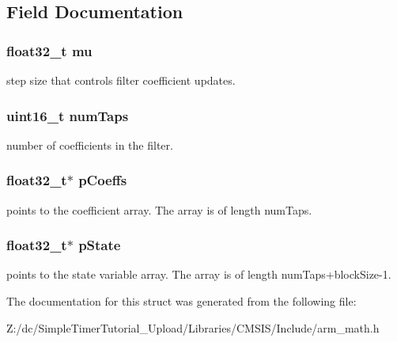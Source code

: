 \subsection{Field Documentation}
\hypertarget{structarm__lms__instance__f32_a11402afa7c9b9dac4cb953fa386e74d2}{
\subsubsection[{mu}]{\setlength{\rightskip}{0pt plus 5cm}float32\-\_\-t mu}}\label{structarm__lms__instance__f32_a11402afa7c9b9dac4cb953fa386e74d2}
step size that controls filter coefficient updates. \hypertarget{structarm__lms__instance__f32_a751941891e47f522a7f5375fe8990aac}{
\subsubsection[{num\-Taps}]{\setlength{\rightskip}{0pt plus 5cm}uint16\-\_\-t num\-Taps}}\label{structarm__lms__instance__f32_a751941891e47f522a7f5375fe8990aac}
number of coefficients in the filter. \hypertarget{structarm__lms__instance__f32_aacbb8dd8eeba4b21fc2bb40076405ee3}{
\subsubsection[{p\-Coeffs}]{\setlength{\rightskip}{0pt plus 5cm}float32\-\_\-t$\ast$ p\-Coeffs}}\label{structarm__lms__instance__f32_aacbb8dd8eeba4b21fc2bb40076405ee3}
points to the coefficient array. The array is of length num\-Taps. \hypertarget{structarm__lms__instance__f32_a335c87e6fdc4b96601d95a5de8b9c463}{
\subsubsection[{p\-State}]{\setlength{\rightskip}{0pt plus 5cm}float32\-\_\-t$\ast$ p\-State}}\label{structarm__lms__instance__f32_a335c87e6fdc4b96601d95a5de8b9c463}
points to the state variable array. The array is of length num\-Taps+block\-Size-\/1. 

The documentation for this struct was generated from the following file\-:\begin{DoxyCompactItemize}
\item 
Z\-:/dc/\-Simple\-Timer\-Tutorial\-\_\-\-Upload/\-Libraries/\-C\-M\-S\-I\-S/\-Include/arm\-\_\-math.\-h\end{DoxyCompactItemize}
